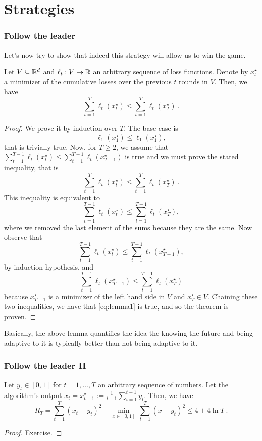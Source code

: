 \documentclass{beamer}
\begin{document}
\section{Strategies}%
\label{sec:}

\begin{frame}
  \frametitle{Follow the leader}
  Let's now try to show that indeed this strategy will allow us to win the game.
  \begin{lemma}
    \label{lemma:be_leader}
    Let $V \subseteq \mathbb{R}^d$ and $\ell_t :V \rightarrow \mathbb{R}$ an arbitrary sequence of loss functions.
    Denote by $x^\star_t$ a minimizer of the cumulative losses over the previous $t$ rounds in $V$. Then, we have
    \[
      \sum_{t=1}^T \ell_t(x^\star_{t}) \leq \sum_{t=1}^T \ell_t(x^\star_{T})~.
    \]
  \end{lemma}
  \begin{proof}
    We prove it by induction over $T$. The base case is
    \[
      \ell_1(x^\star_1) \leq \ell_1(x^\star_{1}),
    \]
    that is trivially true.
    Now, for $T\geq2$, we assume that $\sum_{t=1}^{T-1} \ell_t(x^\star_{t}) \leq \sum_{t=1}^{T-1} \ell_t(x^\star_{T-1})$ is true and we must prove the stated inequality, that is
    \[
      \sum_{t=1}^T \ell_t(x^\star_{t}) \leq \sum_{t=1}^T \ell_t(x^\star_{T})~.
    \]
    This inequality is equivalent to
    \begin{equation}
      \label{eq:lemma1}
      \sum_{t=1}^{T-1} \ell_t(x^\star_{t}) \leq \sum_{t=1}^{T-1} \ell_t(x^\star_{T}),
    \end{equation}
    where we removed the last element of the sums because they are the same.
    Now observe that
    \[
      \sum_{t=1}^{T-1} \ell_t(x^\star_{t}) \leq \sum_{t=1}^{T-1} \ell_t(x^\star_{T-1}),
    \]
    by induction hypothesis, and
    \[
      \sum_{t=1}^{T-1} \ell_t(x^\star_{T-1}) \leq \sum_{t=1}^{T-1} \ell_t(x^\star_{T})
    \]
    because $x^\star_{T-1}$ is a minimizer of the left hand side in $V$ and $x^\star_{T} \in V$.
    Chaining these two inequalities, we have that \eqref{eq:lemma1} is true, and so the theorem is proven.
  \end{proof}
  Basically, the above lemma quantifies the idea the knowing the future and being adaptive to it is typically better than not being adaptive to it.

\end{frame}

\begin{frame}
  \frametitle{Follow the leader II}
  \begin{theorem}
    Let $y_t \in [0,1]$ for $t=1,\dots,T$ an arbitrary sequence of numbers. Let the algorithm's output $x_t=x_{t-1}^\star:=\frac{1}{t-1}\sum_{i=1}^{t-1} y_i$. Then, we have
    \[
      R_T = \sum_{t=1}^T (x_t - y_t)^2 - \min_{x \in [0,1]} \ \sum_{t=1}^T (x - y_t)^2 \leq 4 + 4\ln T~.
    \]
  \end{theorem}
  \begin{proof}
    Exercise.
  \end{proof}

\end{frame}
\end{document}
